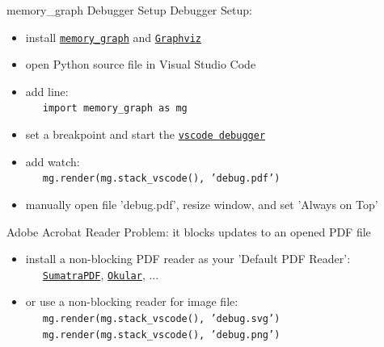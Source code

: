 \documentclass[10pt, colorlinks=true, urlcolor=blue]{beamer}
\begin{document}
\begin{frame}{memory\_graph Debugger Setup}
  \vspace{-1em}
  Debugger Setup:
  \begin{itemize}
  \item install \href{https://pypi.org/project/memory-graph/}{\texttt{memory\_graph}} and \href{https://graphviz.org/download/}{\texttt{Graphviz}}
  \item open Python source file in Visual Studio Code
  \item add line: \\ \ \ \ {\footnotesize \texttt{import memory_graph as mg}}
  \item set a breakpoint and start the \href{https://code.visualstudio.com/docs/python/debugging}{\texttt{vscode debugger}}
  \item add watch: \\ \ \ \ {\footnotesize \texttt{mg.render(mg.stack_vscode(), 'debug.pdf')}}
  \item manually open file 'debug.pdf', resize window,  and set 'Always on Top'
  \end{itemize}
  
  \vspace{1.8em}
  
  Adobe Acrobat Reader Problem: it blocks updates to an opened PDF file
  \begin{itemize}
  \item install a non-blocking PDF reader as your 'Default PDF Reader': \\ \ \ \
    \href{https://www.sumatrapdfreader.org/}{\texttt{SumatraPDF}},
    \href{https://okular.kde.org/}{\texttt{Okular}}, ...
  \item or use a non-blocking reader for image file: \\
\ \ \ {\footnotesize \texttt{mg.render(mg.stack_vscode(), 'debug.svg')}} \\
\ \ \ {\footnotesize \texttt{mg.render(mg.stack_vscode(), 'debug.png')}}
  \end{itemize}
\end{frame}
\end{document}

